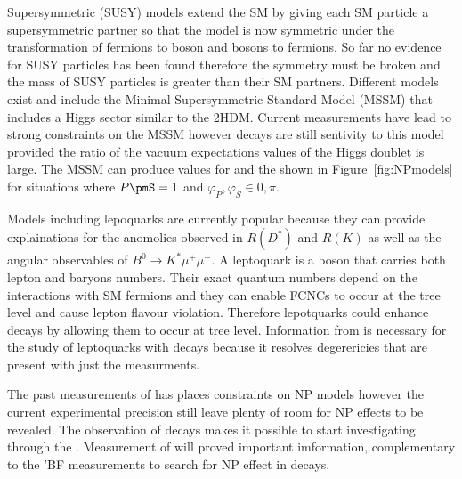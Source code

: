 Supersymmetric (SUSY) models extend the SM by giving each SM particle a supersymmetric partner so that the model is now symmetric under the transformation of fermions to boson and bosons to fermions. So far no evidence for SUSY particles has been found therefore the symmetry must be broken and the mass of SUSY particles is greater than their SM partners. Different models exist and include the Minimal Supersymmetric Standard Model (MSSM) that includes a Higgs sector similar to the 2HDM. Current measurements have lead to strong constraints on the MSSM however \bmumu decays are still sentivity to this model provided the ratio of the vacuum expectations values of the Higgs doublet is large. The MSSM can produce values for \ADG and the \bsmumu \BF shown in Figure~\ref{fig:NPmodels} for situations where $P\pmS =1$ and $\varphi_P, \varphi_S \in {0, \pi}$.

Models including lepoquarks are currently popular because they can provide explainations for the anomolies observed in $R(D^*)$ and $R(K)$ as well as the angular observables of $B^0 \to K^* \mu^+ \mu^-$. A leptoquark is a boson that carries both lepton and baryons numbers. Their exact quantum numbers depend on the interactions with SM fermions and they can enable FCNCs to occur at the tree level and cause lepton flavour violation. Therefore lepotquarks could enhance \bmumu decays by allowing them to occur at tree level. Information from \ADG is necessary for the study of leptoquarks with \bmumu decays because it resolves degerericies that are present with just the \BF measurments.

The past measurements of \bmumu \BFs has places constraints on NP models however the current experimental precision still leave plenty of room for NP effects to be revealed. The observation of \bsmumu decays makes it possible to start investigating \ADG through the \bsmumu \el. Measurement of \ADG will proved important imformation, complementary to the \bmumu 'BF measurements to search for NP effect in \bsmumu decays.
